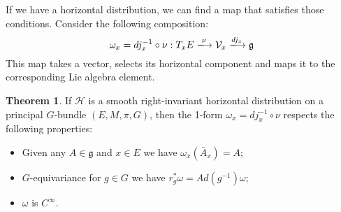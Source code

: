 \documentclass[12pt,a4paper]{report}
\theoremstyle{definition}
\theoremstyle{Theorem}
\newtheorem{Theo}[Def]{Theorem}
\theoremstyle{definition}
\theoremstyle{definition}
\begin{document}
	If we have a horizontal distribution, we can find a map that satisfies those conditions. Consider the following composition:
	$$\omega_{x}=dj_{x}^{-1}\circ \nu:T_{x}E\xlongrightarrow{\nu} \mathcal{V}_{x}\xlongrightarrow{dj_{x}}\mathfrak{g}$$
	This map takes a vector, selects its horizontal component and maps it to the corresponding Lie algebra element.
	\begin{Theo}
		If $\mathcal{H}$ is a smooth right-invariant horizontal distribution on a principal $G$-bundle $(E,M,\pi,G)$, then the 1-form $\omega_{x}=dj_{x}^{-1}\circ \nu$ respects the following properties:
		\begin{itemize}
			\item Given any $A\in\mathfrak{g}$ and $x\in E$ we have $\omega_{x}(\bar{A}_{x})=A$;
			\item $G$-equivariance for $g\in G$ we have $r^*_g\omega=Ad(g^{-1})\omega$;
			\item $\omega$ is $C^\infty$.
		\end{itemize}
	\end{Theo}
\end{document}
